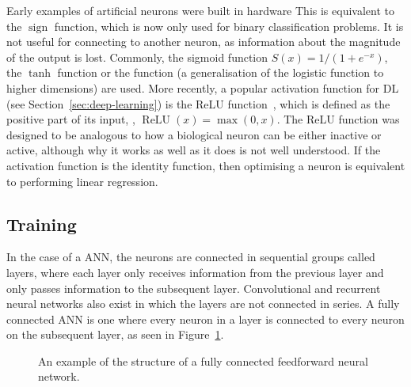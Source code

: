 
Early examples of artificial neurons were built in hardware 
This is equivalent to the \(\operatorname{sign}\) function, which is now only used for binary classification problems.
It is not useful for connecting to another neuron, as information about the magnitude of the output is lost.
Commonly, the sigmoid function \(S(x) = 1/(1 + e^{-x})\), the \(\tanh\) function or the  function (a generalisation of the logistic function to higher dimensions) are used.
More recently, a popular activation function for \ac{DL} (see Section~\ref{sec:deep-learning}) is the \ac{ReLU} function~\autocite{ramachandran2017}, which is defined as the positive part of its input, \ie{}, \(\operatorname{ReLU}(x) = \max(0, x)\).
The \ac{ReLU} function was designed to be analogous to how a biological neuron can be either inactive or active, although why it works as well as it does is not well understood.
If the activation function is the identity function, then optimising a neuron is equivalent to performing linear regression.

\subsection{Training} \label{sec:backpropagation}

In the case of a  \acl{ANN}, the neurons are connected in sequential groups called layers, where each layer only receives information from the previous layer and only passes information to the subsequent layer.
Convolutional and recurrent neural networks also exist in which the layers are not connected in series.
A fully connected \acl{ANN} is one where every neuron in a layer is connected to every neuron on the subsequent layer, as seen in Figure~\ref{fig:neural-network-example}.

\begin{figure}[htbp]
	\centering
	
	\caption{An example of the structure of a fully connected feedforward neural network.}
	\label{fig:neural-network-example}
\end{figure}

